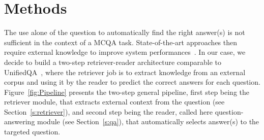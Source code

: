 \documentclass[11pt]{article}
\begin{document}
\begin{table}[htb!]
\centering
\caption{\label{table:ANSWERS}FrenchMedMCQA dataset distribution.}
\end{table}








\section{Methods}
\label{s:methods}

The use alone of the question to automatically find the right answer(s) is not sufficient in the context of a MCQA task. State-of-the-art approaches then require external knowledge to improve system performances~\cite{izacard2020leveraging,https://doi.org/10.48550/arxiv.2005.00700}. In our case, we decide to build a two-step retriever-reader architecture comparable to UnifiedQA~\cite{https://doi.org/10.48550/arxiv.2005.00700}, where the retriever job is to extract knowledge from an external corpus and using it by the reader to predict the correct answers for each question. Figure~\ref{fig:Pipeline} presents the two-step general pipeline, first step being the retriever module, that extracts external context from the question (see Section~\ref{s:retriever}), and second step being the reader, called here question-answering module (see Section~\ref{s:qa}), that automatically selects answer(s) to the targeted question.
\end{document}
